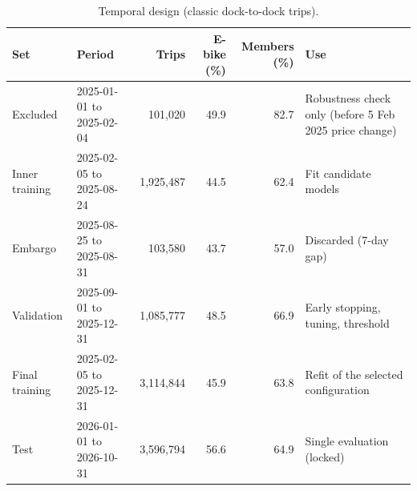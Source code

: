 \begin{table}[!htbp]
\centering
\small
\caption{Temporal design (classic dock-to-dock trips).}
\label{tab:split}
\begin{tabular}{llrrrl}
\toprule
Set & Period & Trips & E-bike (\%) & Members (\%) & Use \\
\midrule
Excluded & 2025-01-01 to 2025-02-04 & 101,020 & 49.9 & 82.7 & Robustness check only (before 5 Feb 2025 price change) \\
Inner training & 2025-02-05 to 2025-08-24 & 1,925,487 & 44.5 & 62.4 & Fit candidate models \\
Embargo & 2025-08-25 to 2025-08-31 & 103,580 & 43.7 & 57.0 & Discarded (7-day gap) \\
Validation & 2025-09-01 to 2025-12-31 & 1,085,777 & 48.5 & 66.9 & Early stopping, tuning, threshold \\
Final training & 2025-02-05 to 2025-12-31 & 3,114,844 & 45.9 & 63.8 & Refit of the selected configuration \\
Test & 2026-01-01 to 2026-10-31 & 3,596,794 & 56.6 & 64.9 & Single evaluation (locked) \\
\bottomrule
\end{tabular}
\end{table}
